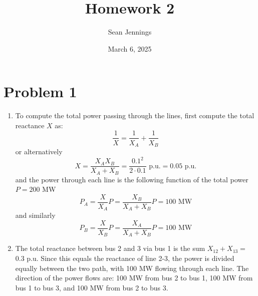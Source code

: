 \documentclass{homework}
\title{Homework 2}
\author{Sean Jennings}
\date{March 6, 2025}
\begin{document}
\maketitle

\section{Problem 1}

\newcommand{\pu}{\text{ p.u.}}
\begin{enumerate}
    \item To compute the total power passing through the lines, first compute the total reactance $X$ as:
    \begin{equation*}
        \frac{1}{X} = \frac{1}{X_A} + \frac{1}{X_B}
    \end{equation*}
    or alternatively
    \begin{equation*}
        X = \frac{X_A X_B}{X_A + X_B} = \frac{0.1^2}{2 \cdot 0.1}  \pu = 0.05 \pu
    \end{equation*}
    and the power through each line is the following function of the total power $P=200$ MW
    \begin{equation*}
        P_A = \frac{X}{X_A} P = \frac{X_B}{X_A + X_B} P = \boxed{100 \text{ MW}}
    \end{equation*}
    and similarly
    \begin{equation*}
        P_B = \frac{X}{X_B} P = \frac{X_A}{X_A + X_B} P = \boxed{100 \text{ MW}}
    \end{equation*}

    \item The total reactance between bus 2 and 3 via bus 1 is the sum $X_{12} + X_{13} = $ 0.3 p.u.
    Since this equals the reactance of line 2-3, the power is divided equally between the two path,
    with 100 MW flowing through each line. The direction of the power flows are: 100 MW from bus 2 to bus 1,
    100 MW from bus 1 to bus 3, and 100 MW from bus 2 to bus 3.

\end{enumerate}
\end{document}
